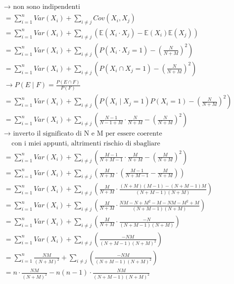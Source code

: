 \documentclass[11pt]{report}
\begin{document}
\begin{itemize}
\begin{equation}
\begin{split}
            & \rightarrow \text{ non sono indipendenti}\\
            & = \sum_{i=1}^n Var(X_i) + \sum_{i \neq j} Cov(X_i, X_j)\\
            & = \sum_{i=1}^n Var(X_i) + \sum_{i \neq j} (\mathbb{E}(X_i \cdot X_j) - \mathbb{E}(X_i)\mathbb{E}(X_j))\\
            & = \sum_{i=1}^n Var(X_i) + \sum_{i \neq j} \left( P(X_i \cdot X_j = 1) - \left( \frac{N}{N+M} \right)^2 \right)\\
            & = \sum_{i=1}^n Var(X_i) + \sum_{i \neq j} \left( P(X_i \cap X_j = 1) - \left( \frac{N}{N+M} \right)^2 \right)\\
            & \rightarrow P(E \mid F) = \frac{P(E \cap F)}{P(F)}\\
            & = \sum_{i=1}^n Var(X_i) + \sum_{i \neq j} \left( P(X_i \mid X_j = 1)P(X_i=1) - \left( \frac{N}{N+M} \right)^2 \right)\\
            & = \sum_{i=1}^n Var(X_i) + \sum_{i \neq j} \left( \frac{N-1}{N-1+M} \cdot \frac{N}{N+M} - \left( \frac{N}{N+M} \right)^2 \right)\\
            & \rightarrow \text{ inverto il significato di N e M per essere coerente}\\
            & \ \ \ \ \ \text{con i miei appunti, altrimenti rischio di sbagliare}\\
            & = \sum_{i=1}^n Var(X_i) + \sum_{i \neq j} \left( \frac{M-1}{N+M-1} \cdot \frac{M}{N+M} - \left( \frac{M}{N+M} \right)^2 \right)\\
            & = \sum_{i=1}^n Var(X_i) + \sum_{i \neq j} \left( \frac{M}{N+M} \cdot \left( \frac{M-1}{N+M-1} - \frac{M}{N+M} \right) \right)\\
            & = \sum_{i=1}^n Var(X_i) + \sum_{i \neq j} \left( \frac{M}{N+M} \cdot \frac{(N+M)(M-1) - (N+M-1)M}{(N+M-1)(N+M)} \right)\\
            & = \sum_{i=1}^n Var(X_i) + \sum_{i \neq j} \left( \frac{M}{N+M} \cdot \frac{NM - N + M^2 - M - NM - M^2 + M}{(N+M-1)(N+M)} \right)\\
            & = \sum_{i=1}^n Var(X_i) + \sum_{i \neq j} \left( \frac{M}{N+M} \cdot \frac{-N}{(N+M-1)(N+M)} \right)\\
            & = \sum_{i=1}^n Var(X_i) + \sum_{i \neq j} \left( \frac{-NM}{(N+M-1)(N+M)^2} \right)\\
            & = \sum_{i=1}^n \frac{NM}{(N+M)^2} + \sum_{i \neq j} \left( \frac{-NM}{(N+M-1)(N+M)^2} \right)\\
            & = n \cdot \frac{NM}{(N+M)^2} - n(n-1) \cdot \frac{NM}{(N+M-1)(N+M)^2}

\end{split}
\end{equation}
\end{itemize}
\end{document}
